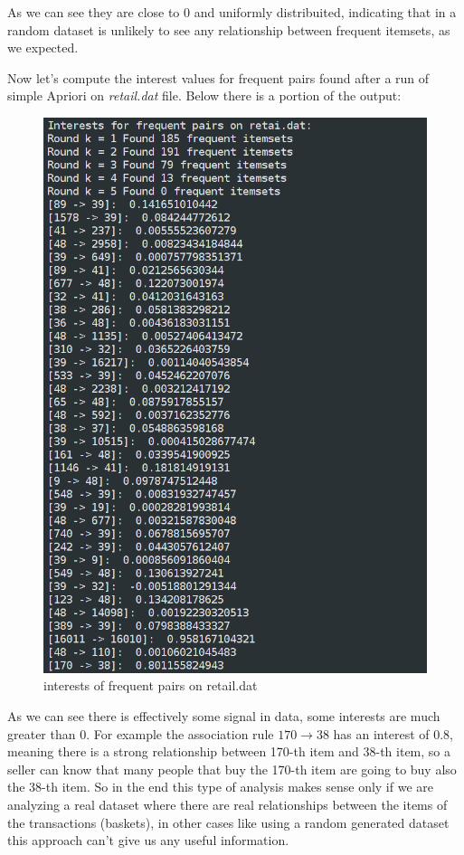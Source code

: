 \documentclass{article}
\begin{document}
As we can see they are close to 0 and uniformly distribuited, indicating that in a random dataset is unlikely to see any relationship between frequent itemsets, as we expected.

Now let's compute the interest values for frequent pairs found after a run of simple Apriori on \textit{retail.dat} file. Below there is a portion of the output:

\begin{figure} 
\centering
\includegraphics[width=150mm]{interestsRetail}
\caption{interests of frequent pairs on retail.dat  \label{interestsRetail}}
\end{figure}

\newpage

As we can see there is effectively some signal in data, some interests are much greater than 0. For example the association rule $170 \rightarrow 38$ has an interest of 0.8, meaning there is
a strong relationship between 170-th item and 38-th item, so a seller can know that many people that buy the 170-th item are going to buy also the 38-th item.
So in the end this type of analysis makes sense only if we are analyzing a real dataset where there are real relationships between the items of the transactions (baskets), in other cases like
using a random generated dataset this approach can't give us any useful information.
\end{document}
